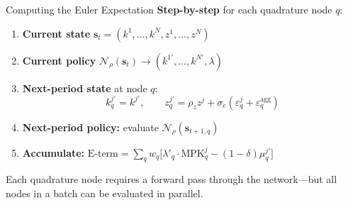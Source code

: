 \documentclass[aspectratio=169,11pt]{beamer}
\newcommand{\emphc}[1]{\textcolor{harvardcrimson}{#1}}
\begin{document}
\begin{frame}{Computing the Euler Expectation}
\textbf{Step-by-step} for each quadrature node $q$:

\vspace{0.3em}
\begin{enumerate}
    \item \textbf{Current state} $\bm{s}_t = (k^1, \ldots, k^N, z^1, \ldots, z^N)$
    \item \textbf{Current policy} $\mathcal{N}_\rho(\bm{s}_t) \to (k^{1\prime}, \ldots, k^{N\prime}, \lambda)$ 
    \item \textbf{Next-period state} at node $q$:
    \[
    k^{j\prime}_q = k^{j\prime}, \qquad z^{j\prime}_q = \rho_z z^j + \sigma_e(\varepsilon^j_q + \varepsilon^{\text{agg}}_q)
    \]
    \item \textbf{Next-period policy:} evaluate $\mathcal{N}_\rho(\bm{s}_{t+1,q})$
    \item \textbf{Accumulate:} $\text{E-term} = \sum_q w_q \bigl[\lambda'_q \cdot \text{MPK}^j_q - (1-\delta)\mu^{j\prime}_q\bigr]$
\end{enumerate}

\vspace{0.3em}
{\small Each quadrature node requires a \emphc{forward pass} through the network---but all nodes in a batch can be evaluated in parallel.}
\end{frame}
\end{document}
